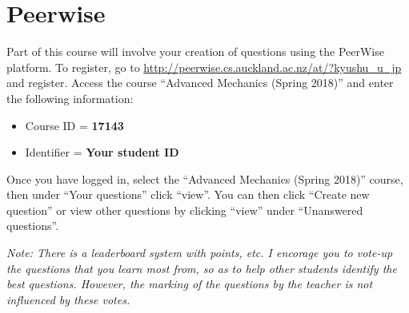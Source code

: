 \newpage
\section{Peerwise}
\label{sec:peerwise}

Part of this course will involve your creation of questions using the PeerWise platform.
To register, go to \url{http://peerwise.cs.auckland.ac.nz/at/?kyushu_u_jp} and register.
Access the course ``Advanced Mechanics (Spring 2018)'' and enter the following information:

\begin{itemize}
    \item Course ID = \textbf{17143}
    \item Identifier = \textbf{Your student ID}
\end{itemize}

Once you have logged in, select the ``Advanced Mechanics (Spring 2018)'' course, then under ``Your questions'' click ``view''. You can then click ``Create new question'' or view other questions by clicking ``view'' under ``Unanswered questions''.

\emph{Note: There is a leaderboard system with points, etc. I encorage you to vote-up the questions that you learn most from, so as to help other students identify the best questions. However, the marking of the questions by the teacher is not influenced by these votes.}

